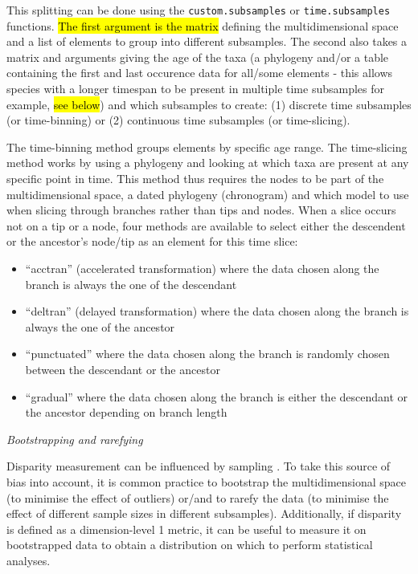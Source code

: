 \documentclass[12pt,letterpaper]{article}
\renewcommand{\subsection}[1]{%
\bigskip
\begin{center}
\begin{large}
\normalfont\itshape #1
\end{large}
\end{center}}
\begin{document}
This splitting can be done using the \texttt{custom.subsamples} or \texttt{time.subsamples} functions.
\hl{The first argument is the matrix} defining the multidimensional space and a list of elements to group into different subsamples.
The second also takes a matrix and arguments giving the age of the taxa (a phylogeny and/or a table containing the first and last occurence data for all/some elements - this allows species with a longer timespan to be present in multiple time subsamples for example, \hl{see below}) and which subsamples to create: (1) discrete time subsamples (or time-binning) or (2) continuous time subsamples (or time-slicing).

The time-binning method groups elements by specific age range.
The time-slicing method works by using a phylogeny and looking at which taxa are present at any specific point in time.
This method thus requires the nodes to be part of the multidimensional space, a dated phylogeny (chronogram) and which model to use when slicing through branches rather than tips and nodes.
When a slice occurs not on a tip or a node, four methods are available to select either the descendent or the ancestor's node/tip as an element for this time slice:
\begin{itemize}
    \item ``acctran'' (accelerated transformation) where the data chosen along the branch is always the one of the descendant
    \item ``deltran'' (delayed transformation) where the data chosen along the branch is always the one of the ancestor
    \item ``punctuated'' where the data chosen along the branch is randomly chosen between the descendant or the ancestor
    \item ``gradual'' where the data chosen along the branch is either the descendant or the ancestor depending on branch length
\end{itemize}

\subsection{Bootstrapping and rarefying}
Disparity measurement can be influenced by sampling \citep{Butler2012}.
To take this source of bias into account, it is common practice to bootstrap the multidimensional space (to minimise the effect of outliers) or/and to rarefy the data (to minimise the effect of different sample sizes in different subsamples).
Additionally, if disparity is defined as a dimension-level 1 metric, it can be useful to measure it on bootstrapped data to obtain a distribution on which to perform statistical analyses.
\end{document}
